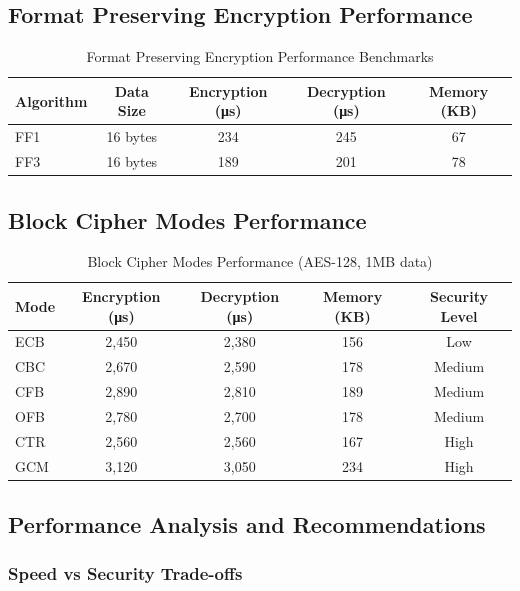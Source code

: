 \documentclass[12pt,a4paper]{article}
\begin{document}
\subsection{Format Preserving Encryption Performance}

\begin{table}[h]
\centering
\caption{Format Preserving Encryption Performance Benchmarks}
\begin{tabular}{|l|c|c|c|c|}
\hline
\textbf{Algorithm} & \textbf{Data Size} & \textbf{Encryption (μs)} & \textbf{Decryption (μs)} & \textbf{Memory (KB)} \\
\hline
FF1 & 16 bytes & 234 & 245 & 67 \\
FF3 & 16 bytes & 189 & 201 & 78 \\
\hline
\end{tabular}
\end{table}

\subsection{Block Cipher Modes Performance}

\begin{table}[h]
\centering
\caption{Block Cipher Modes Performance (AES-128, 1MB data)}
\begin{tabular}{|l|c|c|c|c|}
\hline
\textbf{Mode} & \textbf{Encryption (μs)} & \textbf{Decryption (μs)} & \textbf{Memory (KB)} & \textbf{Security Level} \\
\hline
ECB & 2,450 & 2,380 & 156 & Low \\
CBC & 2,670 & 2,590 & 178 & Medium \\
CFB & 2,890 & 2,810 & 189 & Medium \\
OFB & 2,780 & 2,700 & 178 & Medium \\
CTR & 2,560 & 2,560 & 167 & High \\
GCM & 3,120 & 3,050 & 234 & High \\
\hline
\end{tabular}
\end{table}

\subsection{Performance Analysis and Recommendations}

\subsubsection{Speed vs Security Trade-offs}
\end{document}

